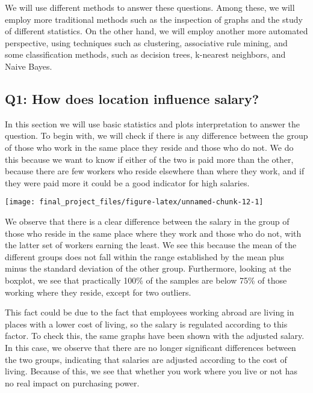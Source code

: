 \documentclass[
]{article}
\begin{document}
We will use different methods to answer these questions. Among these, we
will employ more traditional methods such as the inspection of graphs
and the study of different statistics. On the other hand, we will employ
another more automated perspective, using techniques such as clustering,
associative rule mining, and some classification methods, such as
decision trees, k-nearest neighbors, and Naive Bayes.

\hypertarget{q1-how-does-location-influence-salary}{%
\subsection{Q1: How does location influence
salary?}\label{q1-how-does-location-influence-salary}}

In this section we will use basic statistics and plots interpretation to
answer the question. To begin with, we will check if there is any
difference between the group of those who work in the same place they
reside and those who do not. We do this because we want to know if
either of the two is paid more than the other, because there are few
workers who reside elsewhere than where they work, and if they were paid
more it could be a good indicator for high salaries.

\scriptsize

\begin{center}\texttt{[image: final\_project\_files/figure-latex/unnamed-chunk-12-1]} \end{center}

\normalsize

We observe that there is a clear difference between the salary in the
group of those who reside in the same place where they work and those
who do not, with the latter set of workers earning the least. We see
this because the mean of the different groups does not fall within the
range established by the mean plus minus the standard deviation of the
other group. Furthermore, looking at the boxplot, we see that
practically 100\% of the samples are below 75\% of those working where
they reside, except for two outliers.

This fact could be due to the fact that employees working abroad are
living in places with a lower cost of living, so the salary is regulated
according to this factor. To check this, the same graphs have been shown
with the adjusted salary. In this case, we observe that there are no
longer significant differences between the two groups, indicating that
salaries are adjusted according to the cost of living. Because of this,
we see that whether you work where you live or not has no real impact on
purchasing power.
\end{document}
